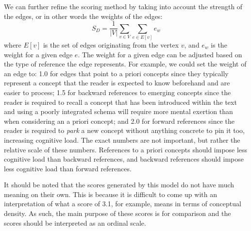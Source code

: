\documentclass[12pt]{article}
\theoremstyle{grammarstyle}
\begin{document}
We can further refine the scoring method by taking into account the strength of the edges, or in other words the weights of the edges:
\begin{equation} \label{eq:weighed score}
    S_D = \frac{1}{|V|} \sum_{v \in V} \sum_{e \in E[v]} e_w
\end{equation}
where $E[v]$ is the set of edges originating from the vertex $v$, and $e_w$ is the weight for a given edge $e$.
The weight for a given edge can be adjusted based on the type of reference the edge represents. For example, we could set the weight of an edge to: 1.0 for edges that point to a priori concepts since they typically represent a concept that the reader is expected to know beforehand and are easier to process; 1.5 for backward references to emerging concepts since the reader is required to recall a concept that has been introduced within the text and using a poorly integrated schema will require more mental exertion than when considering an a priori concept; and 2.0 for forward references since the reader is required to \textit{park} a new concept without anything concrete to pin it too, increasing cognitive load. The exact numbers are not important, but rather the relative scale of these numbers. References to a priori concepts should impose less cognitive load than backward references, and backward references should impose less cognitive load than forward references.

It should be noted that the scores generated by this model do not have much meaning on their own.
This is because it is difficult to come up with an interpretation of what a score of 3.1, for example, means in terms of conceptual density.
As such, the main purpose of these scores is for comparison and the scores should be interpreted as an ordinal scale.
\end{document}
